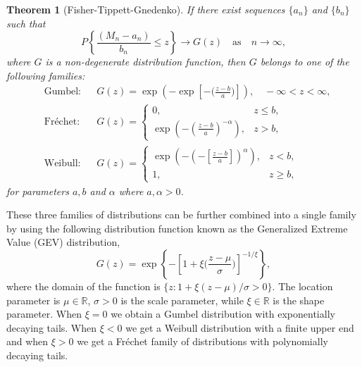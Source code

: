 \documentclass[11pt,a4paper,]{article}
\newtheorem{theorem}{Theorem}[section]
\theoremstyle{definition}
\theoremstyle{definition}
\theoremstyle{definition}
\theoremstyle{remark}
\begin{document}
\begin{theorem}[Fisher-Tippett-Gnedenko]\label{thm:FisherTippett}
    If there exist sequences $\{a_n\}$ and $\{b_n\}$ such that
    $$
        P\left\{ \frac{(M_n - a_n)}{b_n} \leq z \right\} \rightarrow G(z) \quad \text{as} \quad n \to \infty,
    $$
    where $G$ is a non-degenerate distribution function, then $G$ belongs to one of the following families:
    \begin{align}\label{eq:EVT3}
        &\text{Gumbel} :  && G(z) = \exp\left(-\exp \left[- \Big(\frac{z-b}{a}\Big) \right] \right), \quad -\infty < z < \infty , \\
        &\text{Fréchet} : && G(z) =
        \begin{cases}
            0 ,                                                           & z \leq b  , \\
            \exp \left( - \left( \frac{z-b}{a}\right)^{-\alpha} \right) , & z > b    ,
        \end{cases}                     \\
        &\text{Weibull} : && G(z) =
        \begin{cases}
            \exp \left( - \left(- \left[\frac{z-b}{a}\right]\right)^{\alpha} \right) , & z < b  ,    \\
            1 ,                                                                        & z \geq b  ,
        \end{cases}
    \end{align}
    for parameters $a, b$ and $\alpha$ where $a, \alpha >0$.
\end{theorem}

These three families of distributions can be further combined into a single family by using the following distribution function known as the Generalized Extreme Value (GEV) distribution,
\begin{equation}\label{eq:EVT4}
    G(z) = \exp\left\{ -\left[ 1 + \xi\Big(\frac{z - \mu}{\sigma} \Big)\right]^{-1/\xi} \right\} ,
\end{equation}
where the domain of the function is \(\{z: 1 + \xi (z - \mu)/\sigma >0 \}\). The location parameter is \(\mu\in\mathbb{R}\), \(\sigma>0\) is the scale parameter, while \(\xi\in\mathbb{R}\) is the shape parameter. When \(\xi = 0\) we obtain a Gumbel distribution with exponentially decaying tails. When \(\xi < 0\) we get a Weibull distribution with a finite upper end and when \(\xi > 0\) we get a Fréchet family of distributions with polynomially decaying tails.
\end{document}
